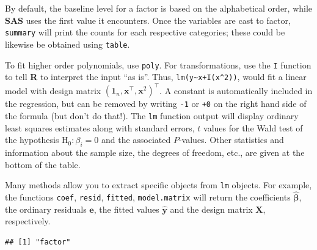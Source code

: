 \documentclass[
  11pt,
  letterpaper,
]{book}
\newenvironment{Shaded}{\begin{snugshade}}{\end{snugshade}}
\newcommand{\AttributeTok}[1]{\textcolor[rgb]{0.77,0.63,0.00}{#1}}
\newcommand{\CommentTok}[1]{\textcolor[rgb]{0.56,0.35,0.01}{\textit{#1}}}
\newcommand{\FunctionTok}[1]{\textcolor[rgb]{0.00,0.00,0.00}{#1}}
\newcommand{\NormalTok}[1]{#1}
\newcommand{\OtherTok}[1]{\textcolor[rgb]{0.56,0.35,0.01}{#1}}
\newcommand{\SpecialCharTok}[1]{\textcolor[rgb]{0.00,0.00,0.00}{#1}}
\newcommand{\StringTok}[1]{\textcolor[rgb]{0.31,0.60,0.02}{#1}}
\theoremstyle{definition}
\theoremstyle{definition}
\theoremstyle{definition}
\theoremstyle{definition}
\theoremstyle{remark}
\begin{document}
By default, the baseline level for a factor is based on the alphabetical order, while \textbf{SAS} uses the first value it encounters. Once the variables are cast to factor, \texttt{summary} will print the counts for each respective categories; these could be likewise be obtained using \texttt{table}.

To fit higher order polynomials, use \texttt{poly}. For transformations, use the \texttt{I} function to tell \textbf{R} to interpret the input ``as is''. Thus, \texttt{lm(y\textasciitilde{}x+I(x\^{}2))}, would fit a linear model with design matrix \((\boldsymbol{1}_n, \mathbf{x}^\top, \mathbf{x}^2)^\top\). A constant is automatically included in the regression, but can be removed by writing \texttt{-1} or \texttt{+0} on the right hand side of the formula (but don't do that!). The \texttt{lm} function output will display ordinary least squares estimates along with standard errors, \(t\) values for the Wald test of the hypothesis \(\mathrm{H}_0: \beta_i=0\) and the associated \(P\)-values. Other statistics and information about the sample size, the degrees of freedom, etc., are given at the bottom of the table.

Many methods allow you to extract specific objects from \texttt{lm} objects. For example, the functions \texttt{coef}, \texttt{resid}, \texttt{fitted}, \texttt{model.matrix} will return the coefficients \(\widehat{\boldsymbol{\beta}}\), the ordinary residuals \(\boldsymbol{e}\), the fitted values \(\widehat{\boldsymbol{y}}\) and the design matrix \(\mathbf{X}\), respectively.

\begin{Shaded}
\end{Shaded}

\begin{verbatim}
## [1] "factor"
\end{verbatim}

\begin{Shaded}
\end{Shaded}
\end{document}
